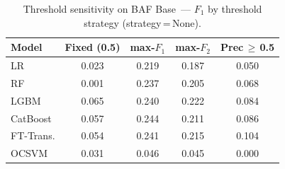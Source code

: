 \begin{table}[ht!]
\centering
\caption{Threshold sensitivity on BAF Base~--- $F_1$ by threshold strategy (strategy\,=\,None).}
\label{tab:threshold_baf_f1}
\begin{tabular}{l c c c c}
\toprule
Model & Fixed (0.5) & max-$F_1$ & max-$F_2$ & Prec\,$\geq$\,0.5 \\
\midrule
LR         & 0.023 & 0.219 & 0.187 & 0.050 \\
RF         & 0.001 & 0.237 & 0.205 & 0.068 \\
LGBM       & 0.065 & 0.240 & 0.222 & 0.084 \\
CatBoost   & 0.057 & 0.244 & 0.211 & 0.086 \\
FT-Trans.  & 0.054 & 0.241 & 0.215 & 0.104 \\
OCSVM      & 0.031 & 0.046 & 0.045 & 0.000 \\
\bottomrule
\end{tabular}
\end{table}